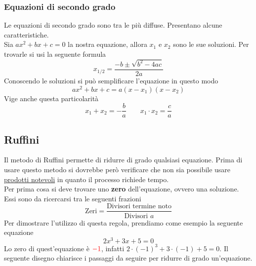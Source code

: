 \subsubsection{Equazioni di secondo grado}
Le equazioni di secondo grado sono tra le più diffuse. Presentano alcune caratteristiche.\\
Sia $ax^2 + bx + c = 0$ la nostra equazione, allora $x_1$ e $x_2$ sono le sue soluzioni. Per trovarle
si usi la seguente formula
\begin{equation*}
x_{1/2} = \frac{-b\pm\sqrt{b^2-4ac}}{2a}
\end{equation*}
Conoscendo le soluzioni si può semplificare l'equazione in questo modo
\begin{equation*}
ax^2+bx+c=a(x-x_1)(x-x_2)
\end{equation*}
Vige anche questa particolarità
\begin{equation*}
x_1+x_2 = -\frac{b}{a} \qquad x_1\cdot x_2 = \frac{c}{a}
\end{equation*}

\subsection{Ruffini}\label{ruffini}
Il metodo di Ruffini permette di ridurre di grado qualsiasi equazione. Prima di usare questo metodo si
dovrebbe però verificare che non sia possibile usare \hyperref[subsec:gen:prodnot]{prodotti notevoli}
in quanto il processo richiede tempo.\\
Per prima cosa si deve trovare uno \textbf{zero} dell'equazione, ovvero una soluzione. Essi sono
da ricercarsi tra le seguenti frazioni
\begin{equation*}
\text{Zeri} = \frac{\text{Divisori termine noto}}{\text{Divisori $a$}}
\end{equation*}
Per dimostrare l'utilizzo di questa regola, prendiamo come esempio la seguente equazione
\begin{equation}\label{eq:ruffini}
2x^3 + 3x + 5 = 0
\end{equation}
Lo zero di quest'equazione è $\mathcolor{red}{-1}$, infatti $2\cdot(-1)^3 + 3\cdot(-1) + 5 = 0$. Il 
seguente disegno chiarisce i passaggi da seguire per ridurre di grado un'equazione.
\begin{center}
\end{center}

